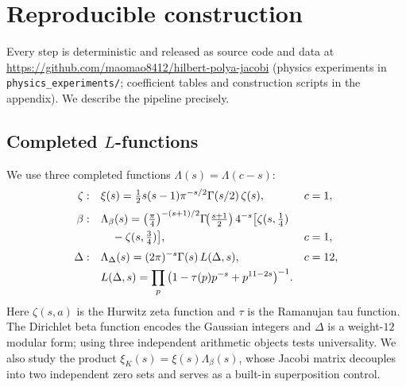 \documentclass[aps,prx,reprint,floatfix]{revtex4-2}
\begin{document}
\section{Reproducible construction}
\label{sec:methods}

Every step is deterministic and released as source code and data at
\url{https://github.com/maomao8412/hilbert-polya-jacobi} (physics experiments
in \texttt{physics\_experiments/}; coefficient tables and construction
scripts in the appendix). We describe the pipeline precisely.

\subsection{Completed $L$-functions}
We use three completed functions $\Lambda(s)=\Lambda(c-s)$:
\begin{align}
\zeta:\quad &\xi(s)=\tfrac12 s(s-1)\pi^{-s/2}\Gamma(s/2)\,\zeta(s),
   && c=1,\\[2pt]
\beta:\quad &\Lambda_\beta(s)=\big(\tfrac{\pi}{4}\big)^{-(s+1)/2}
   \Gamma\!\big(\tfrac{s+1}{2}\big)\,4^{-s}
   \big[\zeta(s,\tfrac14)\notag\\
   &\quad-\zeta(s,\tfrac34)\big],
   && c=1,\\[2pt]
\Delta:\quad &\Lambda_\Delta(s)=(2\pi)^{-s}\Gamma(s)\,L(\Delta,s),
   && c=12,\notag\\
   &L(\Delta,s)=\prod_p\big(1-\tau(p)p^{-s}+p^{11-2s}\big)^{-1}.
\end{align}
Here $\zeta(s,a)$ is the Hurwitz zeta function and $\tau$ is the Ramanujan
tau function. The Dirichlet beta function encodes the Gaussian integers and
$\Delta$ is a weight-$12$ modular form; using three independent arithmetic
objects tests universality. We also study the product
$\xi_K(s)=\xi(s)\Lambda_\beta(s)$, whose Jacobi matrix decouples into two
independent zero sets and serves as a built-in superposition control.
\end{document}
